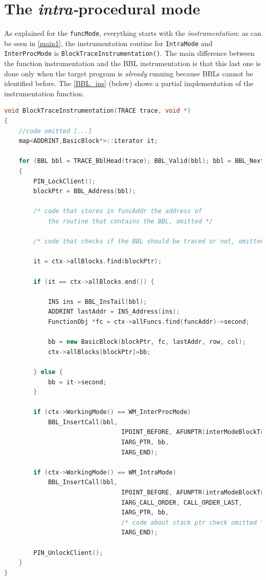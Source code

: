 \documentclass[a4paper,10pt]{report}
\begin{document}
\section{The \emph{intra-}procedural mode}

As explained for the \verb|funcMode|, everything starts with the \emph{instrumentation}:
as can be seen in \cref{main1}, the instrumentation routine for \verb|IntraMode| and \verb|InterProcMode| is \verb|BlockTraceInstrumentation()|. The main difference between the 
function instrumentation and the BBL instrumentation is that this last one is done
only when the target program is \emph{already} running because BBLs cannot be 
identified before. The \cref{BBL_ins} (below) shows a partial implementation of the instrumentation function.


\begin{lstlisting}[language=C++, 
	caption={partial implementation of \texttt{BlockTraceInstrumentation()}}, 
	label=BBL_ins, frame=leftline, showstringspaces=false]
void BlockTraceInstrumentation(TRACE trace, void *)
{
	//code omitted [...]
	map<ADDRINT,BasicBlock*>::iterator it;

    for (BBL bbl = TRACE_BblHead(trace); BBL_Valid(bbl); bbl = BBL_Next(bbl))
    {
		PIN_LockClient();
 		blockPtr = BBL_Address(bbl);

		/* code that stores in funcAddr the address of 
			the routine that contains the BBL, omitted */

		/* code that checks if the BBL should be traced or not, omitted */

		it = ctx->allBlocks.find(blockPtr);

		if (it == ctx->allBlocks.end()) {

			INS ins = BBL_InsTail(bbl);
			ADDRINT lastAddr = INS_Address(ins);
			FunctionObj *fc = ctx->allFuncs.find(funcAddr)->second;

			bb = new BasicBlock(blockPtr, fc, lastAddr, row, col); 
			ctx->allBlocks[blockPtr]=bb;

		} else {		
			bb = it->second;
		}

		if (ctx->WorkingMode() == WM_InterProcMode)
			BBL_InsertCall(bbl, 
								IPOINT_BEFORE, AFUNPTR(interModeBlockTrace), 
								IARG_PTR, bb, 
								IARG_END);		

		if (ctx->WorkingMode() == WM_IntraMode)
			BBL_InsertCall(bbl, 
								IPOINT_BEFORE, AFUNPTR(intraModeBlockTrace), 
								IARG_CALL_ORDER, CALL_ORDER_LAST, 
								IARG_PTR, bb, 
								/* code about stack ptr check omitted */
								IARG_END);		

		PIN_UnlockClient();
    }
}

\end{lstlisting}
\end{document}
